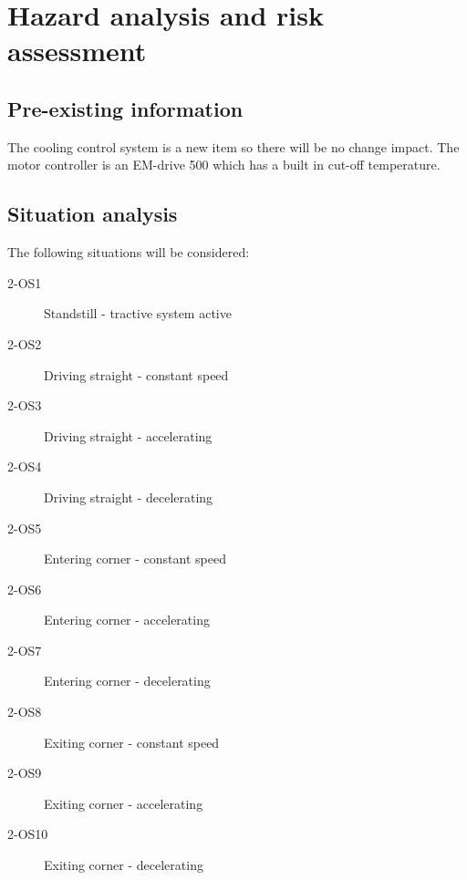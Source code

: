 \section{Hazard analysis and risk assessment}
%
%
%

\subsection{Pre-existing information}
%

The cooling control system is a new item so there will be no change impact.
The motor controller is an EM-drive 500 which has a built in cut-off temperature.

\subsection{Situation analysis}
%
%

The following situations will be considered:
\begin{description}
\item [2-OS1] Standstill - tractive system active
\item [2-OS2] Driving straight - constant speed
\item [2-OS3] Driving straight - accelerating
\item [2-OS4] Driving straight - decelerating
\item [2-OS5] Entering corner - constant speed
\item [2-OS6] Entering corner - accelerating
\item [2-OS7] Entering corner - decelerating
\item [2-OS8] Exiting corner - constant speed
\item [2-OS9] Exiting corner - accelerating
\item [2-OS10] Exiting corner - decelerating
\end{description}

